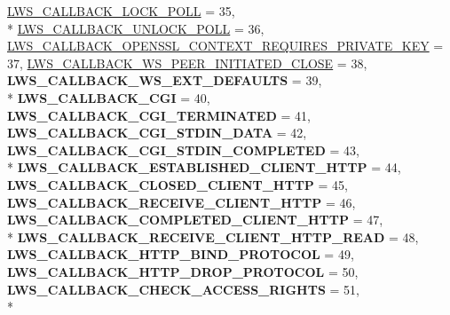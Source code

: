 \begin{DoxyCompactItemize}
\hyperlink{group__usercb_ggad62860e19975ba4c4af401c3cdb6abf7a8909732521d379179003d97ab7a05428}{L\+W\+S\+\_\+\+C\+A\+L\+L\+B\+A\+C\+K\+\_\+\+L\+O\+C\+K\+\_\+\+P\+O\+LL} = 35, 
\\*
\hyperlink{group__usercb_ggad62860e19975ba4c4af401c3cdb6abf7a0e9e3dd667c0c42cdbe1a3d921f4fd79}{L\+W\+S\+\_\+\+C\+A\+L\+L\+B\+A\+C\+K\+\_\+\+U\+N\+L\+O\+C\+K\+\_\+\+P\+O\+LL} = 36, 
\hyperlink{group__usercb_ggad62860e19975ba4c4af401c3cdb6abf7aa46f705dcf97502e95627ffde614f98b}{L\+W\+S\+\_\+\+C\+A\+L\+L\+B\+A\+C\+K\+\_\+\+O\+P\+E\+N\+S\+S\+L\+\_\+\+C\+O\+N\+T\+E\+X\+T\+\_\+\+R\+E\+Q\+U\+I\+R\+E\+S\+\_\+\+P\+R\+I\+V\+A\+T\+E\+\_\+\+K\+EY} = 37, 
\hyperlink{group__usercb_ggad62860e19975ba4c4af401c3cdb6abf7ac3fc5bbb55e69f90396526287ee84a51}{L\+W\+S\+\_\+\+C\+A\+L\+L\+B\+A\+C\+K\+\_\+\+W\+S\+\_\+\+P\+E\+E\+R\+\_\+\+I\+N\+I\+T\+I\+A\+T\+E\+D\+\_\+\+C\+L\+O\+SE} = 38, 
{\bfseries L\+W\+S\+\_\+\+C\+A\+L\+L\+B\+A\+C\+K\+\_\+\+W\+S\+\_\+\+E\+X\+T\+\_\+\+D\+E\+F\+A\+U\+L\+TS} = 39, 
\\*
{\bfseries L\+W\+S\+\_\+\+C\+A\+L\+L\+B\+A\+C\+K\+\_\+\+C\+GI} = 40, 
{\bfseries L\+W\+S\+\_\+\+C\+A\+L\+L\+B\+A\+C\+K\+\_\+\+C\+G\+I\+\_\+\+T\+E\+R\+M\+I\+N\+A\+T\+ED} = 41, 
{\bfseries L\+W\+S\+\_\+\+C\+A\+L\+L\+B\+A\+C\+K\+\_\+\+C\+G\+I\+\_\+\+S\+T\+D\+I\+N\+\_\+\+D\+A\+TA} = 42, 
{\bfseries L\+W\+S\+\_\+\+C\+A\+L\+L\+B\+A\+C\+K\+\_\+\+C\+G\+I\+\_\+\+S\+T\+D\+I\+N\+\_\+\+C\+O\+M\+P\+L\+E\+T\+ED} = 43, 
\\*
{\bfseries L\+W\+S\+\_\+\+C\+A\+L\+L\+B\+A\+C\+K\+\_\+\+E\+S\+T\+A\+B\+L\+I\+S\+H\+E\+D\+\_\+\+C\+L\+I\+E\+N\+T\+\_\+\+H\+T\+TP} = 44, 
{\bfseries L\+W\+S\+\_\+\+C\+A\+L\+L\+B\+A\+C\+K\+\_\+\+C\+L\+O\+S\+E\+D\+\_\+\+C\+L\+I\+E\+N\+T\+\_\+\+H\+T\+TP} = 45, 
{\bfseries L\+W\+S\+\_\+\+C\+A\+L\+L\+B\+A\+C\+K\+\_\+\+R\+E\+C\+E\+I\+V\+E\+\_\+\+C\+L\+I\+E\+N\+T\+\_\+\+H\+T\+TP} = 46, 
{\bfseries L\+W\+S\+\_\+\+C\+A\+L\+L\+B\+A\+C\+K\+\_\+\+C\+O\+M\+P\+L\+E\+T\+E\+D\+\_\+\+C\+L\+I\+E\+N\+T\+\_\+\+H\+T\+TP} = 47, 
\\*
{\bfseries L\+W\+S\+\_\+\+C\+A\+L\+L\+B\+A\+C\+K\+\_\+\+R\+E\+C\+E\+I\+V\+E\+\_\+\+C\+L\+I\+E\+N\+T\+\_\+\+H\+T\+T\+P\+\_\+\+R\+E\+AD} = 48, 
{\bfseries L\+W\+S\+\_\+\+C\+A\+L\+L\+B\+A\+C\+K\+\_\+\+H\+T\+T\+P\+\_\+\+B\+I\+N\+D\+\_\+\+P\+R\+O\+T\+O\+C\+OL} = 49, 
{\bfseries L\+W\+S\+\_\+\+C\+A\+L\+L\+B\+A\+C\+K\+\_\+\+H\+T\+T\+P\+\_\+\+D\+R\+O\+P\+\_\+\+P\+R\+O\+T\+O\+C\+OL} = 50, 
{\bfseries L\+W\+S\+\_\+\+C\+A\+L\+L\+B\+A\+C\+K\+\_\+\+C\+H\+E\+C\+K\+\_\+\+A\+C\+C\+E\+S\+S\+\_\+\+R\+I\+G\+H\+TS} = 51, 
\\*

\end{DoxyCompactItemize}
